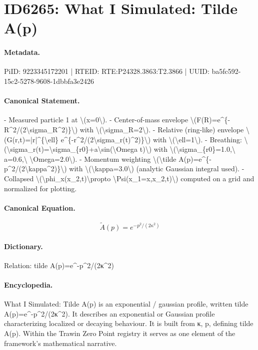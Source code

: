 \section*{ID6265: What I Simulated: Tilde A(p)}
\paragraph{Metadata.}
PiID: 9223345172201 | RTEID: RTE:P24328.3863:T2.3866 | UUID: ba5fc592-15c2-5278-9608-1dbbfa3e2426

\paragraph{Canonical Statement.}
- Measured particle 1 at \textbackslash{}(x=0\textbackslash{}). - Center-of-mass envelope \textbackslash{}(F(R)=e\textasciicircum{}\{-R\textasciicircum{}2/(2\textbackslash{}sigma\_R\textasciicircum{}2)\}\textbackslash{}) with \textbackslash{}(\textbackslash{}sigma\_R=2\textbackslash{}). - Relative (ring-like) envelope \textbackslash{}(G(r,t)=|r|\textasciicircum{}\{\textbackslash{}ell\} e\textasciicircum{}\{-r\textasciicircum{}2/(2\textbackslash{}sigma\_r(t)\textasciicircum{}2)\}\textbackslash{}) with \textbackslash{}(\textbackslash{}ell=1\textbackslash{}). - Breathing: \textbackslash{}(\textbackslash{}sigma\_r(t)=\textbackslash{}sigma\_\{r0\}+a\textbackslash{}sin(\textbackslash{}Omega t)\textbackslash{}) with \textbackslash{}(\textbackslash{}sigma\_\{r0\}=1.0,\textbackslash{} a=0.6,\textbackslash{} \textbackslash{}Omega=2.0\textbackslash{}). - Momentum weighting \textbackslash{}(\textbackslash{}tilde A(p)=e\textasciicircum{}\{-p\textasciicircum{}2/(2\textbackslash{}kappa\textasciicircum{}2)\}\textbackslash{}) with \textbackslash{}(\textbackslash{}kappa=3.0\textbackslash{}) (analytic Gaussian integral used). - Collapsed \textbackslash{}(\textbackslash{}phi\_x(x\_2,t)\textbackslash{}propto \textbackslash{}Psi(x\_1=x,x\_2,t)\textbackslash{}) computed on a grid and normalized for plotting.

\paragraph{Canonical Equation.}
\[
\tilde A(p)=e^{-p^2/(2\kappa^2)}
\]

\paragraph{Dictionary.}
Relation: tilde A(p)=e\textasciicircum{}-p\textasciicircum{}2/(2κ\textasciicircum{}2)

\paragraph{Encyclopedia.}
What I Simulated: Tilde A(p) is an exponential / gaussian profile, written tilde A(p)=e\textasciicircum{}-p\textasciicircum{}2/(2κ\textasciicircum{}2). It describes an exponential or Gaussian profile characterizing localized or decaying behaviour. It is built from κ, p, defining tilde A(p). Within the Trawin Zero Point registry it serves as one element of the framework's mathematical narrative.
